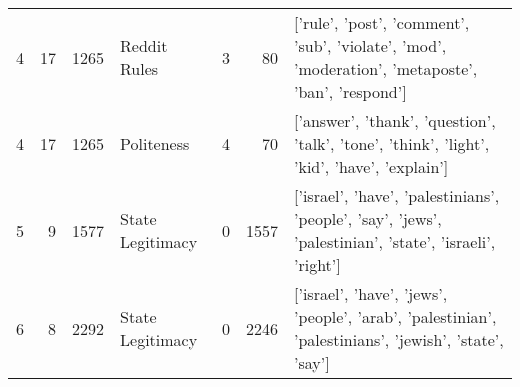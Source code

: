 \begin{tabular}{lrrlrrl}
4 & 17 & 1265 & Reddit Rules & 3 & 80 & ['rule', 'post', 'comment', 'sub', 'violate', 'mod', 'moderation', 'metaposte', 'ban', 'respond'] \\
4 & 17 & 1265 & Politeness & 4 & 70 & ['answer', 'thank', 'question', 'talk', 'tone', 'think', 'light', 'kid', 'have', 'explain'] \\
5 & 9 & 1577 & State Legitimacy & 0 & 1557 & ['israel', 'have', 'palestinians', 'people', 'say', 'jews', 'palestinian', 'state', 'israeli', 'right'] \\
6 & 8 & 2292 & State Legitimacy & 0 & 2246 & ['israel', 'have', 'jews', 'people', 'arab', 'palestinian', 'palestinians', 'jewish', 'state', 'say'] \\
\bottomrule
\end{tabular}
